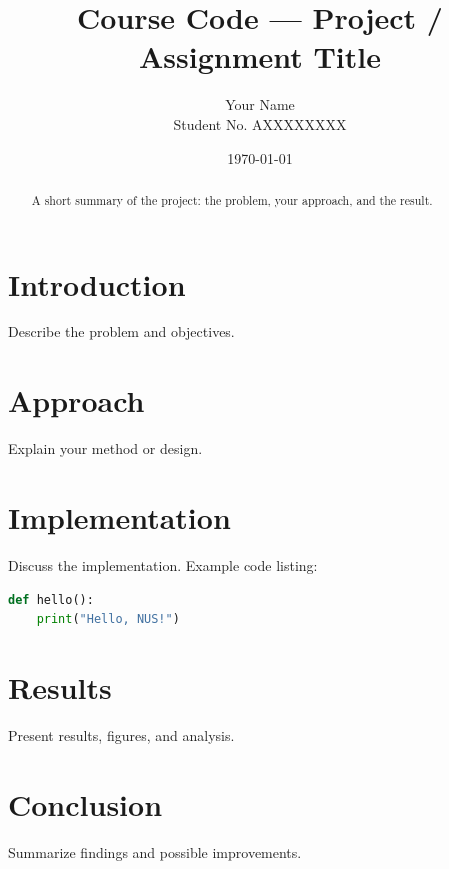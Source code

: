 \documentclass[11pt,a4paper]{article}
\title{Course Code --- Project / Assignment Title}
\author{Your Name \\ Student No. AXXXXXXXX}
\date{\today}
\begin{document}
\maketitle

\begin{abstract}
A short summary of the project: the problem, your approach, and the result.
\end{abstract}

\tableofcontents
\bigskip

\section{Introduction}
Describe the problem and objectives.

\section{Approach}
Explain your method or design.

\section{Implementation}
Discuss the implementation. Example code listing:
\begin{lstlisting}[language=Python]
def hello():
    print("Hello, NUS!")
\end{lstlisting}

\section{Results}
Present results, figures, and analysis.

\section{Conclusion}
Summarize findings and possible improvements.
\end{document}

